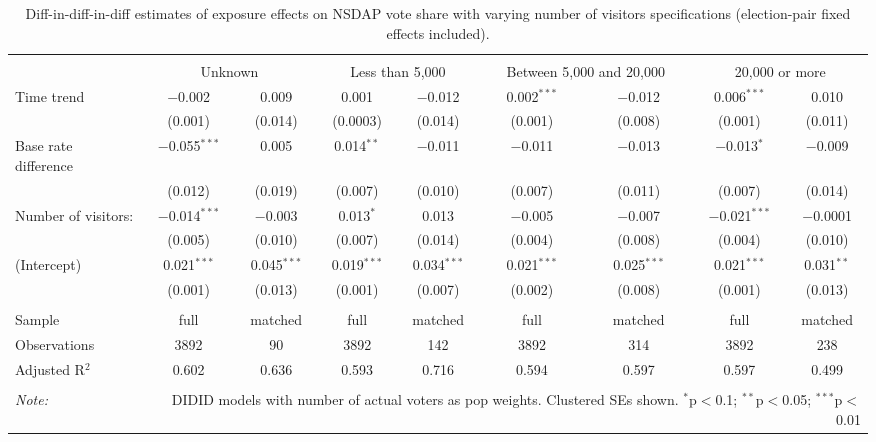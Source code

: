 
\begin{table}[!htbp] \centering 
  \caption{Diff-in-diff-in-diff estimates of exposure effects on NSDAP vote share with varying number of visitors specifications (election-pair fixed effects included).\vspace{-.25cm}} 
  \label{tab:nsdap-voteshare-numvisitors-dd} 
\scriptsize 
\begin{tabular}{@{\extracolsep{5pt}}lcccccccc} 
\\[-1.8ex]\hline 
\hline \\[-1.8ex] 
 & \multicolumn{2}{c}{Unknown} & \multicolumn{2}{c}{Less than 5,000} & \multicolumn{2}{c}{Between 5,000 and 20,000} & \multicolumn{2}{c}{20,000 or more} \\ 
 \cmidrule(r){2-3}\cmidrule(r){4-5}\cmidrule(r){6-7}\cmidrule(r){8-9}Time trend & $-$0.002 & 0.009 & 0.001 & $-$0.012 & 0.002$^{***}$ & $-$0.012 & 0.006$^{***}$ & 0.010 \\ 
  & (0.001) & (0.014) & (0.0003) & (0.014) & (0.001) & (0.008) & (0.001) & (0.011) \\ 
  Base rate difference & $-$0.055$^{***}$ & 0.005 & 0.014$^{**}$ & $-$0.011 & $-$0.011 & $-$0.013 & $-$0.013$^{*}$ & $-$0.009 \\ 
  & (0.012) & (0.019) & (0.007) & (0.010) & (0.007) & (0.011) & (0.007) & (0.014) \\ 
  Number of visitors: & $-$0.014$^{***}$ & $-$0.003 & 0.013$^{*}$ & 0.013 & $-$0.005 & $-$0.007 & $-$0.021$^{***}$ & $-$0.0001 \\ 
  & (0.005) & (0.010) & (0.007) & (0.014) & (0.004) & (0.008) & (0.004) & (0.010) \\ 
  (Intercept) & 0.021$^{***}$ & 0.045$^{***}$ & 0.019$^{***}$ & 0.034$^{***}$ & 0.021$^{***}$ & 0.025$^{***}$ & 0.021$^{***}$ & 0.031$^{**}$ \\ 
  & (0.001) & (0.013) & (0.001) & (0.007) & (0.002) & (0.008) & (0.001) & (0.013) \\ 
 \hline \\[-1.8ex] 
Sample & full & matched & full & matched & full & matched & full & matched \\ 
Observations & 3892 & 90 & 3892 & 142 & 3892 & 314 & 3892 & 238 \\ 
Adjusted R$^{2}$ & 0.602 & 0.636 & 0.593 & 0.716 & 0.594 & 0.597 & 0.597 & 0.499 \\ 
\hline 
\hline \\[-1.8ex] 
\textit{Note:}  & \multicolumn{8}{r}{DIDID models with number of actual voters as pop weights. Clustered SEs shown. $^{*}$p$<$0.1; $^{**}$p$<$0.05; $^{***}$p$<$0.01} \\ 
\end{tabular} 
\end{table} 

